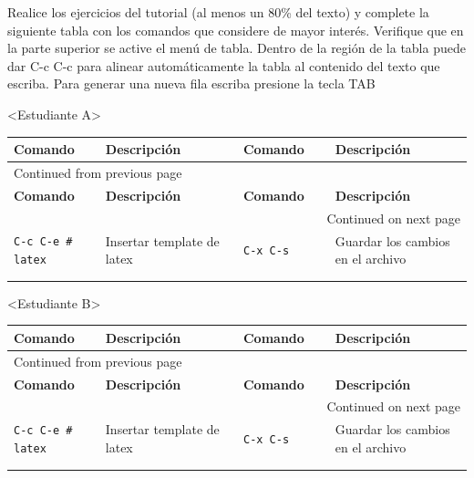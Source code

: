 \documentclass{article}
\begin{document}
Realice los ejercicios del tutorial (al menos un 80\% del texto) y
complete la siguiente tabla con los comandos que considere de mayor
interés. Verifique que en la parte superior se active el menú de
tabla. Dentro de la región de la tabla puede dar C-c C-c para alinear
automáticamente la tabla al contenido del texto que escriba. Para
generar una nueva fila escriba presione la tecla TAB

<Estudiante A>
\begin{longtable}{|p{0.2\linewidth}|p{0.3\linewidth}|p{0.2\linewidth}|p{0.3\linewidth}|}
\textbf{Comando} & \textbf{Descripción} & \textbf{Comando} & \textbf{Descripción}\\[0pt]
\hline
\endfirsthead
\multicolumn{4}{l}{Continued from previous page} \\[0pt]
\hline

\textbf{Comando} & \textbf{Descripción} & \textbf{Comando} & \textbf{Descripción} \\[0pt]

\hline
\endhead
\hline\multicolumn{4}{r}{Continued on next page} \\
\endfoot
\endlastfoot
\hline
\texttt{C-c C-e \# latex} & Insertar template de  latex & \texttt{C-x C-s} & Guardar los cambios en el archivo\\[0pt]
 &  &  & \\[0pt]
 &  &  & \\[0pt]
\end{longtable}

<Estudiante B>
\begin{longtable}{|p{0.2\linewidth}|p{0.3\linewidth}|p{0.2\linewidth}|p{0.3\linewidth}|}
\textbf{Comando} & \textbf{Descripción} & \textbf{Comando} & \textbf{Descripción}\\[0pt]
\hline
\endfirsthead
\multicolumn{4}{l}{Continued from previous page} \\[0pt]
\hline

\textbf{Comando} & \textbf{Descripción} & \textbf{Comando} & \textbf{Descripción} \\[0pt]

\hline
\endhead
\hline\multicolumn{4}{r}{Continued on next page} \\
\endfoot
\endlastfoot
\hline
\texttt{C-c C-e \# latex} & Insertar template de  latex & \texttt{C-x C-s} & Guardar los cambios en el archivo\\[0pt]
 &  &  & \\[0pt]
 &  &  & \\[0pt]
\end{longtable}
\end{document}
